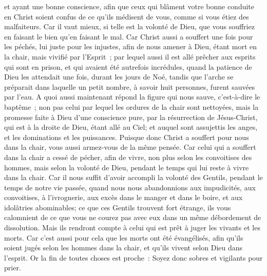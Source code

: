 \begin{multicols}{2}
et ayant une bonne conscience, afin que ceux qui blâment votre bonne conduite en Christ soient confus de ce qu'ils médisent de vous, comme si vous étiez des malfaiteurs.
Car il vaut mieux, si telle est la volonté de Dieu, que vous souffriez en faisant le bien qu'en faisant le mal.
Car Christ aussi a souffert une fois pour les péchés, lui juste pour les injustes, afin de nous amener à Dieu, étant mort en la chair, mais vivifié par l'Esprit~;
par lequel aussi il est allé prêcher aux esprits qui sont en prison,
et qui avaient été autrefois incrédules, quand la patience de Dieu les attendait une fois, durant les jours de Noé, tandis que l'arche se préparait dans laquelle un petit nombre, à savoir huit personnes, furent sauvées par l'eau.
A quoi aussi maintenant répond la figure qui nous sauve, c'est-à-dire le baptême~; non pas celui par lequel les ordures de la chair sont nettoyées, mais la promesse faite à Dieu d'une conscience pure, par la résurrection de Jésus-Christ,
qui est à la droite de Dieu, étant allé au Ciel; et auquel sont assujettis les anges, et les dominations et les puissances.
\VerseOne{}Puisque donc Christ a souffert pour nous dans la chair, vous aussi armez-vous de la même pensée. Car celui qui a souffert dans la chair a cessé de pécher,
afin de vivre, non plus selon les convoitises des hommes, mais selon la volonté de Dieu, pendant le temps qui lui reste à vivre dans la chair.
Car il nous suffit d'avoir accompli la volonté des Gentils, pendant le temps de notre vie passée, quand nous nous abandonnions aux impudicités, aux convoitises, à l'ivrognerie, aux excès dans le manger et dans le boire, et aux idolâtries abominables;
ce que ces Gentils trouvent fort étrange, ils vous calomnient de ce que vous ne courez pas avec eux dans un même débordement de dissolution. 
Mais ils rendront compte à celui qui est prêt à juger les vivants et les morts.
Car c'est aussi pour cela que les morts ont été évangélisés, afin qu'ils soient jugés selon les hommes dans la chair, et qu'ils vivent selon Dieu dans l'esprit. 
Or la fin de toutes choses est proche~: Soyez donc sobres et vigilants pour prier. 

\end{multicols}
